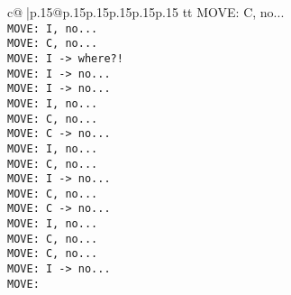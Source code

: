 \documentclass{article}
\begin{document}
{\begin{supertabular}{c@{$\;$}|p{.15\linewidth}@{}p{.15\linewidth}p{.15\linewidth}p{.15\linewidth}p{.15\linewidth}p{.15\linewidth}}
{{{tt  MOVE: C, no...\\ \tt  MOVE: I, no...\\ \tt  MOVE: C, no...\\ \tt  MOVE: I -> where?!\\ \tt  MOVE: I -> no...\\ \tt  MOVE: I -> no...\\ \tt  MOVE: I, no...\\ \tt  MOVE: C, no...\\ \tt  MOVE: C -> no...\\ \tt  MOVE: I, no...\\ \tt  MOVE: C, no...\\ \tt  MOVE: I -> no...\\ \tt  MOVE: C, no...\\ \tt  MOVE: C -> no...\\ \tt  MOVE: I, no...\\ \tt  MOVE: C, no...\\ \tt  MOVE: C, no...\\ \tt  MOVE: I -> no...\\ \tt  MOVE:}}}
\end{supertabular}}
\end{document}
